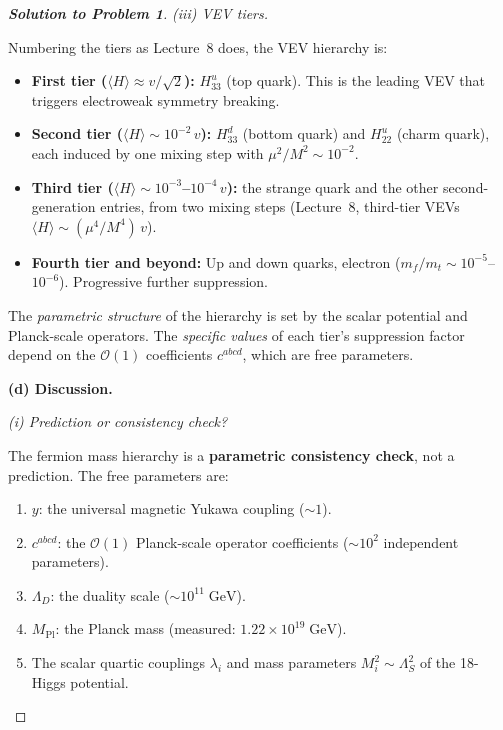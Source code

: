\documentclass[11pt,a4paper]{article}
\begin{document}
\begin{proof}[\textbf{Solution to Problem 1}]
\textit{(iii) VEV tiers.}

Numbering the tiers as Lecture~8 does, the VEV hierarchy is:
\begin{itemize}
  \item \textbf{First tier ($\langle H \rangle \approx v/\sqrt{2}$):}
    $H_{33}^u$ (top quark).  This is the leading VEV that triggers
    electroweak symmetry breaking.
  \item \textbf{Second tier ($\langle H \rangle \sim 10^{-2}\, v$):}
    $H_{33}^d$ (bottom quark) and $H_{22}^u$ (charm quark), each
    induced by one mixing step with $\mu^2/M^2 \sim 10^{-2}$.
  \item \textbf{Third tier ($\langle H \rangle \sim 10^{-3}$--$10^{-4}\, v$):}
    the strange quark and the other second-generation entries, from
    two mixing steps (Lecture~8, third-tier VEVs
    $\langle H\rangle \sim (\mu^4/M^4)\,v$).
  \item \textbf{Fourth tier and beyond:}
    Up and down quarks, electron ($m_f/m_t \sim 10^{-5}$--$10^{-6}$).
    Progressive further suppression.
\end{itemize}

The \emph{parametric structure} of the hierarchy is
set by the scalar potential and Planck-scale operators.  The
\emph{specific values} of each tier's suppression factor depend on the
$\mathcal{O}(1)$ coefficients $c^{abcd}$, which are free parameters.

\bigskip

\textbf{(d) Discussion.}

\textit{(i) Prediction or consistency check?}

The fermion mass hierarchy is a \textbf{parametric consistency check},
not a prediction.  The free parameters are:
\begin{enumerate}
  \item $y$: the universal magnetic Yukawa coupling ($\sim 1$).
  \item $c^{abcd}$: the $\mathcal{O}(1)$ Planck-scale operator
    coefficients ($\sim 10^2$ independent parameters).
  \item $\Lambda_D$: the duality scale ($\sim 10^{11}\;\text{GeV}$).
  \item $M_{\text{Pl}}$: the Planck mass (measured:
    $1.22 \times 10^{19}\;\text{GeV}$).
  \item The scalar quartic couplings $\lambda_i$ and mass parameters
    $M_i^2 \sim \Lambda_S^2$ of the 18-Higgs potential.
\end{enumerate}


\end{proof}
\end{document}
